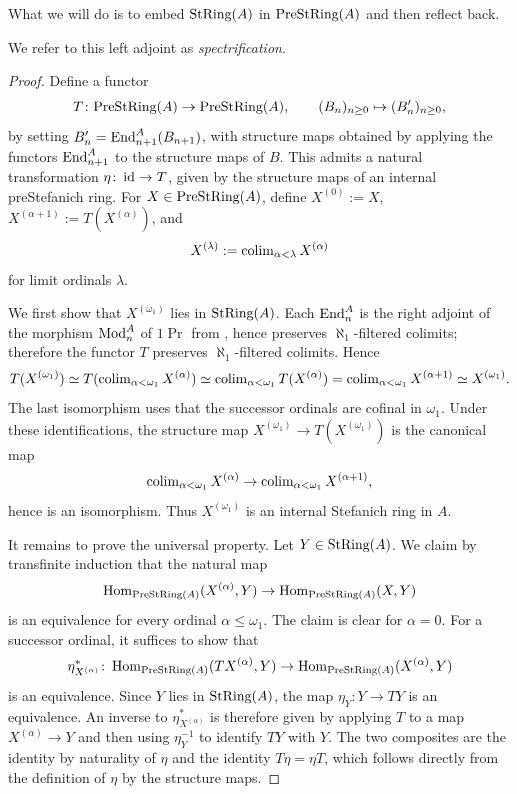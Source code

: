 \documentclass[11pt]{book}
\begin{document}
	What we will do is to embed ${\textup{StRing}}(A)$ in ${\textup{PreStRing}}(A)$ and then reflect back.

	\begin{lemma}\label[lemma]{lem:Spectrification_Left_Adjoint}
		The inclusion $\StRing(A) \hookrightarrow \PreStRing(A)$ admits a left adjoint.
	\end{lemma}
	We refer to this left adjoint as \emph{spectrification}.
	\begin{proof}
		Define a functor
		\[
			T \colon {\textup{PreStRing}}(A) \to {\textup{PreStRing}}(A), \qquad (B_n)_{n \geq 0} \mapsto (B'_n)_{n \geq 0},
		\]
		by setting $B'_n = \operatorname{End}^A_{n+1}(B_{n+1})$, with structure maps obtained by applying the functors $\operatorname{End}^A_{n+1}$ to the structure maps of $B$. This admits a natural transformation $\eta\colon \operatorname{id} \to T$, given by the structure maps of an internal preStefanich ring. For $X \in {\textup{PreStRing}}(A)$, define $X^{(0)} := X$, $X^{(\alpha + 1)} := T(X^{(\alpha)})$, and
		\[
			X^{(\lambda)} := \operatorname{colim}_{\alpha < \lambda} X^{(\alpha)}
		\]
		for limit ordinals $\lambda$.

		We first show that $X^{(\omega_1)}$ lies in ${\textup{StRing}}(A)$. Each $\operatorname{End}^A_n$ is the right adjoint of the morphism ${\textup{Mod}}^A_n$ of $1\Pr$ from , hence preserves $\aleph_1$-filtered colimits; therefore the functor $T$ preserves $\aleph_1$-filtered colimits. Hence
		\[
			T(X^{(\omega_1)})
			\simeq
			T(\operatorname{colim}_{\alpha < \omega_1} X^{(\alpha)})
			\simeq
			\operatorname{colim}_{\alpha < \omega_1} T(X^{(\alpha)})
			=
			\operatorname{colim}_{\alpha < \omega_1} X^{(\alpha+1)}
			\simeq
			X^{(\omega_1)}.
		\]
		The last isomorphism uses that the successor ordinals are cofinal in $\omega_1$. Under these identifications, the structure map $X^{(\omega_1)} \to T(X^{(\omega_1)})$ is the canonical map
		\[
			\operatorname{colim}_{\alpha < \omega_1} X^{(\alpha)} \to \operatorname{colim}_{\alpha < \omega_1} X^{(\alpha+1)},
		\]
		hence is an isomorphism. Thus $X^{(\omega_1)}$ is an internal Stefanich ring in $A$.

		It remains to prove the universal property. Let $Y \in {\textup{StRing}}(A)$. We claim by transfinite induction that the natural map
		\[
			\operatorname{Hom}_{{\textup{PreStRing}}(A)}(X^{(\alpha)},Y) \to \operatorname{Hom}_{{\textup{PreStRing}}(A)}(X,Y)
		\]
		is an equivalence for every ordinal $\alpha \leq \omega_1$. The claim is clear for $\alpha = 0$. For a successor ordinal, it suffices to show that
		\[
			\eta_{X^{(\alpha)}}^*\colon \operatorname{Hom}_{{\textup{PreStRing}}(A)}(T X^{(\alpha)},Y) \to \operatorname{Hom}_{{\textup{PreStRing}}(A)}(X^{(\alpha)},Y)
		\]
		is an equivalence. Since $Y$ lies in ${\textup{StRing}}(A)$, the map $\eta_Y\colon Y \to TY$ is an equivalence. An inverse to $\eta_{X^{(\alpha)}}^*$ is therefore given by applying $T$ to a map $X^{(\alpha)} \to Y$ and then using $\eta_Y^{-1}$ to identify $TY$ with $Y$. The two composites are the identity by naturality of $\eta$ and the identity $T\eta = \eta T$, which follows directly from the definition of $\eta$ by the structure maps.


\end{proof}
\end{document}
